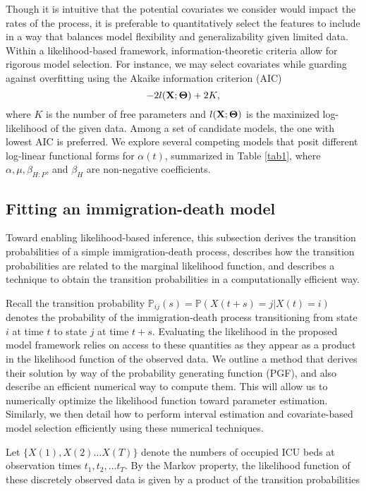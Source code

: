 \documentclass{article}
\newcommand{\achal}[1]{{\color{black}{ #1}}}
\begin{document}
Though it is intuitive that the potential covariates we consider would impact the rates of the process, it is preferable to quantitatively select the features to include in a way that balances model flexibility and generalizability given limited data. Within a likelihood-based framework, information-theoretic  criteria allow for rigorous model selection. For instance, we may select covariates while guarding against overfitting using the Akaike information criterion (AIC)
$$-2l(\achal{\mathbf{X}};\mathbf{\Theta}) + 2K,$$ where $K$ is the number of free parameters and $l(\achal{\mathbf{X}};\mathbf{\Theta})$ is the maximized log-likelihood of the given data. Among a set of candidate models, the one with lowest AIC is preferred. We explore several competing models that posit different log-linear functional forms for $\alpha(t)$, summarized in Table \ref{tab1}, where $\alpha, \mu, \beta_{H:P}$, and $\beta_{H}$ are non-negative coefficients. 

\subsection{Fitting an immigration-death model}
\label{Fitting an immigration-death model}
Toward enabling likelihood-based inference, this subsection derives the transition probabilities of a simple immigration-death process, describes how the transition probabilities are related to the marginal likelihood function, and describes a technique to obtain the transition probabilities in a computationally efficient way. \par 

Recall the transition probability $\mathbb{P}_{ij}(s) = \mathbb{P}(X(t+s)=j|X(t)=i)$ denotes the probability of the immigration-death process transitioning from state $i$ at time $t$ to state $j$ at time $t+s$. Evaluating the likelihood in the proposed model framework relies on  access to these quantities as they appear as a product in the likelihood function of the observed data. We outline a method that derives their solution by way of the probability generating function (PGF), and also describe an efficient numerical way to compute them. This will allow us to numerically optimize the likelihood function toward parameter estimation. Similarly, we then detail how to perform interval estimation and covariate-based model selection efficiently using these numerical techniques. \par

Let $\{X(1), X(2) \dots X(T)\}$ denote the  numbers of occupied ICU beds at observation times $t_1,t_2,\ldots t_T$. By the Markov property, the likelihood function of these discretely observed data is given by a product of the transition probabilities
\end{document}

